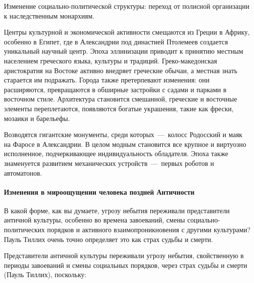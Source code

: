 Изменение социально-политической структуры: переход от полисной организации к наследственным монархиям. 

Центры культурной и экономической активности смещаются из Греции в Африку, особенно в Египет, где в Александрии под династией Птолемеев создается уникальный научный центр. Эпоха эллинизации приводит к принятию местным населением греческого языка, культуры и традиций. Греко-македонская аристократия на Востоке активно внедряет греческие обычаи, а местная знать старается им подражать. Города также претерпевают изменения: они расширяются, превращаются в обширные застройки с садами и парками в восточном стиле. Архитектура становится смешанной, греческие и восточные элементы переплетаются, появляются богатые украшения, такие как фрески, мозаики и барельефы. 

Возводятся гигантские монументы, среди которых~---~колосс Родосский и маяк на Фаросе в Александрии. В целом модным становится все крупное и виртуозно исполненное, подчеркивающее индивидуальность обладателя. Эпоха также знаменуется развитием механических устройств~---~первых роботов и автоматонов.



\paragraph{Изменения в мироощущении человека поздней Античности}

В какой форме, как вы думаете, угрозу небытия переживали
представители античной культуры, особенно во времена завоеваний, смены
социально-политических порядков и активного взаимопроникновения с другими
культурами? Пауль Тиллих очень точно определяет это как страх судьбы и смерти. 

Представители античной культуры переживали угрозу небытия, свойственную в периоды завоеваний и смены социальных порядков, через страх судьбы и смерти (Пауль Тиллих), поскольку:

